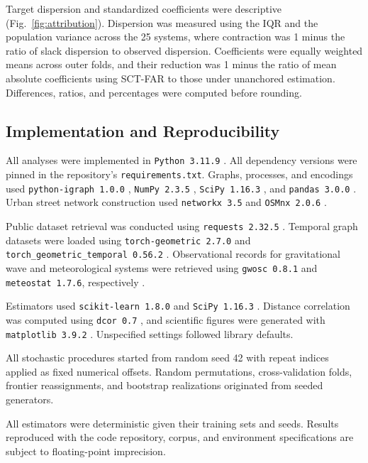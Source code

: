 \documentclass{article}
\begin{document}
Target dispersion and standardized coefficients were descriptive (Fig.~\ref{fig:attribution}). Dispersion was measured using the IQR and the population variance across the 25 systems, where contraction was 1 minus the ratio of slack dispersion to observed dispersion. Coefficients were equally weighted means across outer folds, and their reduction was 1 minus the ratio of mean absolute coefficients using SCT-FAR to those under unanchored estimation. Differences, ratios, and percentages were computed before rounding.

\subsection*{Implementation and Reproducibility}
\label{sub-sec:imp-rep}

All analyses were implemented in \texttt{Python 3.11.9} \citep{ref86,ref102}. All dependency versions were pinned in the repository's \texttt{requirements.txt}. Graphs, processes, and encodings used \texttt{python-igraph 1.0.0} \citep{ref48,ref93}, \texttt{NumPy 2.3.5} \citep{ref81,ref96}, \texttt{SciPy 1.16.3} \citep{ref82,ref97}, and \texttt{pandas 3.0.0} \citep{ref83,ref84}. Urban street network construction used \texttt{networkx 3.5} \citep{ref91,ref98} and \texttt{OSMnx 2.0.6} \citep{ref118,ref119}.

Public dataset retrieval was conducted using \texttt{requests 2.32.5} \citep{ref120}. Temporal graph datasets were loaded using \texttt{torch-geometric 2.7.0} \citep{ref89,ref99} and \texttt{torch\_geometric\_temporal 0.56.2} \citep{ref90,ref100}. Observational records for gravitational wave and meteorological systems were retrieved using \texttt{gwosc 0.8.1} and \texttt{meteostat 1.7.6}, respectively \citep{ref116,ref117}.

Estimators used \texttt{scikit-learn 1.8.0} \citep{ref72,ref94} and \texttt{SciPy 1.16.3} \citep{ref82,ref97}. Distance correlation was computed using \texttt{dcor 0.7} \citep{ref88}, and scientific figures were generated with \texttt{matplotlib 3.9.2} \citep{ref92,ref101}. Unspecified settings followed library defaults.

All stochastic procedures started from random seed 42 with repeat indices applied as fixed numerical offsets. Random permutations, cross-validation folds, frontier reassignments, and bootstrap realizations originated from seeded generators. 

All estimators were deterministic given their training sets and seeds. Results reproduced with the code repository, corpus, and environment specifications are subject to floating-point imprecision.
\clearpage
\end{document}
